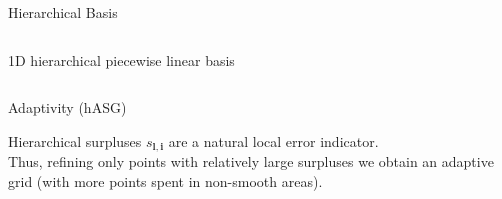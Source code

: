 \documentclass[final]{beamer}
\newcommand {\bxi} {\mbox{\boldmath $\xi$}}%
\newcommand{\bl}{\ensuremath{\mathbf{l}}} %
\newcommand{\bi}{\ensuremath{\mathbf{i}}} %
\begin{document}
\begin{frame}{}
{\begin{columns}[t]
\begin{column}{.30\linewidth}
\begin{block}{\centering Hierarchical Basis}
\begin{columns}[T]
\begin{column}{12cm}{}
\vspace{1em}
\centering \scriptsize{1D hierarchical piecewise linear basis}
\end{column}
\end{columns}


\end{block}
                
 \begin{block}{\centering Adaptivity (hASG)}

Hierarchical surpluses $s_{\bl,\bi}$ are a natural local error indicator.\\

Thus, refining only points with relatively large surpluses we obtain an adaptive grid (with more points spent in non-smooth areas).\\
%


\end{block}
\end{column}
\end{columns}}
\end{frame}
\end{document}
